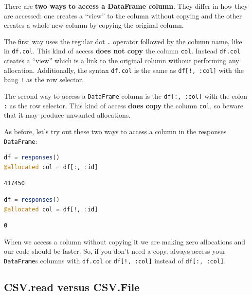 \documentclass[
  notoc %
]{tufte-book}
\newcommand{\passthrough}[1]{#1}
\begin{document}
There are \textbf{two ways to access a DataFrame column}. They differ in
how they are accessed: one creates a ``view'' to the column without
copying and the other creates a whole new column by copying the original
column.

The first way uses the regular dot \passthrough{\lstinline!.!} operator
followed by the column name, like in \passthrough{\lstinline!df.col!}.
This kind of access \textbf{does not copy} the column
\passthrough{\lstinline!col!}. Instead \passthrough{\lstinline!df.col!}
creates a ``view'' which is a link to the original column without
performing any allocation. Additionally, the syntax
\passthrough{\lstinline!df.col!} is the same as
\passthrough{\lstinline"df[!, :col]"} with the bang
\passthrough{\lstinline"!"} as the row selector.

The second way to access a \passthrough{\lstinline!DataFrame!} column is
the \passthrough{\lstinline!df[:, :col]!} with the colon
\passthrough{\lstinline!:!} as the row selector. This kind of access
\textbf{does copy} the column \passthrough{\lstinline!col!}, so beware
that it may produce unwanted allocations.

As before, let's try out these two ways to access a column in the
responses \passthrough{\lstinline!DataFrame!}:

\begin{lstlisting}[language=Julia]
df = responses()
@allocated col = df[:, :id]
\end{lstlisting}

\begin{lstlisting}
417450
\end{lstlisting}

\begin{lstlisting}[language=Julia]
df = responses()
@allocated col = df[!, :id]
\end{lstlisting}

\begin{lstlisting}
0
\end{lstlisting}

When we access a column without copying it we are making zero
allocations and our code should be faster. So, if you don't need a copy,
always access your \passthrough{\lstinline!DataFrame!}s columns with
\passthrough{\lstinline!df.col!} or
\passthrough{\lstinline"df[!, :col]"} instead of
\passthrough{\lstinline!df[:, :col]!}.

\hypertarget{sec:df_performance_csv_read_file}{%
\subsection{CSV.read versus
CSV.File}\label{sec:df_performance_csv_read_file}}
\end{document}
